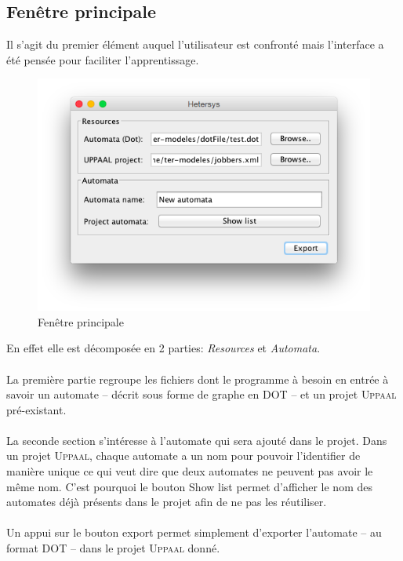 \documentclass[12pt,a4paper]{report}
\begin{document}
\subsection{Fenêtre principale}

Il s'agit du premier élément auquel l'utilisateur est confronté mais l'interface a été 
pensée pour faciliter l'apprentissage.

\begin{figure}[!h]
  \centering
  \includegraphics[scale=0.6]{ressources/gui/home.png}
  \caption{Fenêtre principale}
\end{figure}

En effet elle est décomposée en 2 parties: \emph{Resources} et \emph{Automata}. 
\\\\
La première partie regroupe les fichiers dont le programme à besoin en entrée à savoir 
un automate -- décrit sous forme de graphe en DOT -- et un projet \textsc{Uppaal} pré-existant.
\\\\
La seconde section s'intéresse à l'automate qui sera ajouté dans le projet. Dans un projet
\textsc{Uppaal}, chaque automate a un nom pour pouvoir l'identifier de manière unique ce qui veut
dire que deux automates ne peuvent pas avoir le même nom. C'est pourquoi le bouton 
\og{}Show list\fg{} permet d'afficher le nom des automates déjà présents dans le projet 
afin de ne pas les réutiliser.
\\\\
Un appui sur le bouton export permet simplement d'exporter l'automate -- au format DOT -- 
dans le projet \textsc{Uppaal} donné.
\end{document}
